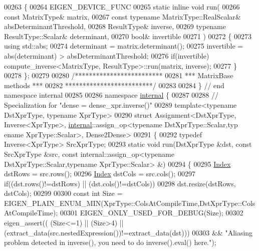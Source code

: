 \begin{DoxyCode}
00263 \{
00264   EIGEN\_DEVICE\_FUNC
00265   \textcolor{keyword}{static} \textcolor{keyword}{inline} \textcolor{keywordtype}{void} run(
00266     \textcolor{keyword}{const} MatrixType& matrix,
00267     \textcolor{keyword}{const} \textcolor{keyword}{typename} MatrixType::RealScalar& absDeterminantThreshold,
00268     ResultType& inverse,
00269     \textcolor{keyword}{typename} ResultType::Scalar& determinant,
00270     \textcolor{keywordtype}{bool}& invertible
00271   )
00272   \{
00273     \textcolor{keyword}{using} std::abs;
00274     determinant = matrix.determinant();
00275     invertible = abs(determinant) > absDeterminantThreshold;
00276     \textcolor{keywordflow}{if}(invertible) compute\_inverse<MatrixType, ResultType>::run(matrix, inverse);
00277   \}
00278 \};
00279 
00280 \textcolor{comment}{/*************************}
00281 \textcolor{comment}{*** MatrixBase methods ***}
00282 \textcolor{comment}{*************************/}
00283 
00284 \} \textcolor{comment}{// end namespace internal}
00285 
00286 \textcolor{keyword}{namespace }\hyperlink{namespaceinternal}{internal} \{
00287 
00288 \textcolor{comment}{// Specialization for "dense = dense\_xpr.inverse()"}
00289 \textcolor{keyword}{template}<\textcolor{keyword}{typename} DstXprType, \textcolor{keyword}{typename} XprType>
00290 \textcolor{keyword}{struct }Assignment<DstXprType, Inverse<XprType>, \hyperlink{namespaceinternal}{internal}::assign\_op<typename DstXprType::Scalar,typ
      ename XprType::Scalar>, Dense2Dense>
00291 \{
00292   \textcolor{keyword}{typedef} Inverse<XprType> SrcXprType;
00293   \textcolor{keyword}{static} \textcolor{keywordtype}{void} run(DstXprType &dst, \textcolor{keyword}{const} SrcXprType &src, \textcolor{keyword}{const} internal::assign\_op<typename
       DstXprType::Scalar,typename XprType::Scalar> &)
00294   \{
00295     \hyperlink{namespace_eigen_a62e77e0933482dafde8fe197d9a2cfde}{Index} dstRows = src.rows();
00296     \hyperlink{namespace_eigen_a62e77e0933482dafde8fe197d9a2cfde}{Index} dstCols = src.cols();
00297     \textcolor{keywordflow}{if}((dst.rows()!=dstRows) || (dst.cols()!=dstCols))
00298       dst.resize(dstRows, dstCols);
00299     
00300     \textcolor{keyword}{const} \textcolor{keywordtype}{int} Size = EIGEN\_PLAIN\_ENUM\_MIN(XprType::ColsAtCompileTime,DstXprType::ColsAtCompileTime);
00301     EIGEN\_ONLY\_USED\_FOR\_DEBUG(Size);
00302     eigen\_assert(( (Size<=1) || (Size>4) || (extract\_data(src.nestedExpression())!=extract\_data(dst)))
00303               && \textcolor{stringliteral}{"Aliasing problem detected in inverse(), you need to do inverse().eval() here."});

\end{DoxyCode}
